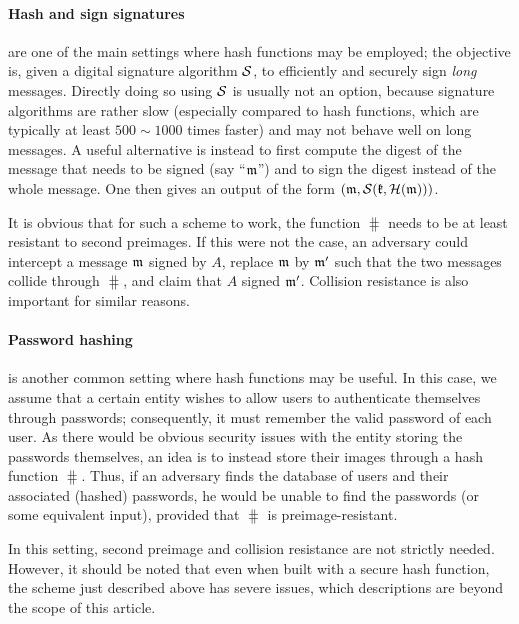 \paragraph{Hash and sign signatures} are one of the main settings where hash functions may be employed; the objective is, given a digital signature
algorithm $\operatorname{\mathcal{S}}$, to efficiently and securely sign \emph{long} messages. Directly doing so using $\operatorname{\mathcal{S}}$ is usually not an option, because signature algorithms are rather slow (especially compared
to hash functions, which are typically at least $500 \sim 1000$ times faster) and may not behave well on long messages. A useful alternative is instead to first compute the digest of the
message that needs to be signed (say ``$\mathfrak{m}$'') and to sign the digest instead of the whole message. One then gives an output of the form $(\mathfrak{m}, \operatorname{\mathcal{S}}(\mathfrak{k},\operatorname{\mathcal{H}}(\mathfrak{m})))$. 

It is obvious that for such a scheme to work, the function $\hash$ needs to be at least resistant to second preimages. If this were not the case, an adversary could intercept a message $\mathfrak{m}$
signed by $A$, replace $\mathfrak{m}$ by $\mathfrak{m}'$ such that the two messages collide through $\hash$, and claim that $A$ signed $\mathfrak{m}'$.
Collision resistance is also important for similar reasons.

\paragraph{Password hashing} is another common setting where hash functions may be useful. In this case, we assume that a certain entity wishes to allow users to authenticate themselves
through passwords; consequently, it must remember the valid password of each user. As there would be obvious security issues with the entity storing the passwords themselves, an idea
is to instead store their images through a hash function $\hash$. Thus, if an adversary finds the database of users and their associated (hashed) passwords, he would be unable to find
the passwords (or some equivalent input), provided that $\hash$ is preimage-resistant.

In this setting, second preimage and collision resistance are not strictly needed. However, it should be noted that even when built with a secure hash function,
the scheme just described above has severe issues, which descriptions are beyond the scope of this article.


